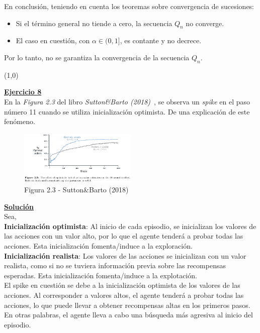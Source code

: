 \documentclass[12pt]{article}
\newlength\tindent
\renewcommand{\indent}{\hspace*{\tindent}}
\begin{document}
    En conclusión, teniendo en cuenta los teoremas sobre convergencia de sucesiones:

    \begin{itemize}
        \item Si el término general no tiende a cero, la secuencia $Q_n$ no converge.
        \item El caso en cuestión, con $\alpha \in (0,1]$, es contante y no decrece.
    \end{itemize}

    Por lo tanto, no se garantiza la convergencia de la secuencia $Q_n$.

    \line(1,0){\textwidth}

    \indent\underline{\textbf{Ejercicio 8}}\\
    En la \textit{Figura 2.3} del libro \textit{Sutton\&Barto (2018)}~\cite{Sutton2018}, se observa un \textit{spike} en el paso número 11 cuando se utiliza inicialización optimista.
    De una explicación de este fenómeno.

    \begin{figure}[H]
        \centering
        \includegraphics[width=0.5\textwidth]{../img/Figura2_3_SuttonBarto}
        \caption{Figura 2.3 - Sutton\&Barto (2018)}
        \label{fig:fig_2_3}
    \end{figure}

    \indent\underline{\textbf{Solución}}\\
    Sea,\\
    \textbf{Inicialización optimista}: Al inicio de cada episodio, se inicializan los valores de las acciones con un valor alto, por lo que el agente tenderá a probar todas las acciones.
    Esta inicialización fomenta/induce a la exploración.\\
    \textbf{Inicialización realista}: Los valores de las acciones se inicializan con un valor realista, como si no se tuviera información previa sobre las recompensas esperadas.
    Esta inicialización fomenta/induce a la explotación.\\

    El spike en cuestión se debe a la inicialización optimista de los valores de las acciones.
    Al corresponder a valores altos, el agente tenderá a probar todas las acciones, lo que puede llevar a obtener recompensas altas en los primeros pasos.
    En otras palabras, el agente lleva a cabo una búsqueda más agresiva al inicio del episodio.
\end{document}
